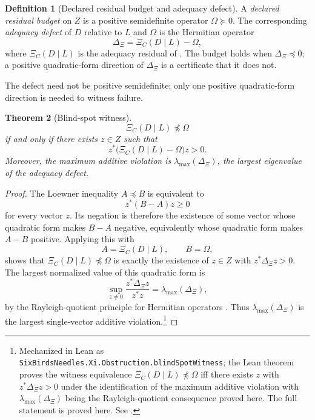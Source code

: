 \documentclass[11pt]{article}
\newcommand{\preceqq}{\preceq}
\newtheorem{theorem}{Theorem}[section]
\theoremstyle{definition}
\newtheorem{definition}[theorem]{Definition}
\begin{document}
\begin{definition}[Declared residual budget and adequacy defect]\label{def:xi:adequacy-defect}
A \emph{declared residual budget} on \(Z\) is a positive semidefinite operator
\(\Omega\succeq 0\).  The corresponding \emph{adequacy defect} of \(D\)
relative to \(L\) and \(\Omega\) is the Hermitian operator
\[
  \Delta_\Xi=\Xi_C(D\mid L)-\Omega,
\]
where \(\Xi_C(D\mid L)\) is the adequacy residual of
.  The budget holds when
\(\Delta_\Xi\preceqq 0\); a positive quadratic-form direction of
\(\Delta_\Xi\) is a certificate that it does not.
\end{definition}

The defect need not be positive semidefinite; only one positive quadratic-form
direction is needed to witness failure.

\begin{theorem}[Blind-spot witness]\label{thm:xi:blind-spot-witness}
\[
  \Xi_C(D\mid L)\npreceq \Omega
\]
if and only if there exists \(z\in Z\) such that
\[
  \boxed{z^*\bigl(\Xi_C(D\mid L)-\Omega\bigr)z>0.}
\]
Moreover, the maximum additive violation is \(\lambda_{\max}(\Delta_\Xi)\),
the largest eigenvalue of the adequacy defect.
\end{theorem}

\begin{proof}
The Loewner inequality \(A\preceqq B\) is equivalent to
\[
  z^*(B-A)z\geq 0
\]
for every vector \(z\).  Its negation is therefore the existence of some vector
whose quadratic form makes \(B-A\) negative, equivalently whose quadratic form
makes \(A-B\) positive.  Applying this with
\[
  A=\Xi_C(D\mid L),
  \qquad
  B=\Omega,
\]
shows that \(\Xi_C(D\mid L)\npreceq\Omega\) is exactly the existence of
\(z\in Z\) with \(z^*\Delta_\Xi z>0\).  The largest normalized value of this
quadratic form is
\[
  \sup_{z\neq 0}\frac{z^*\Delta_\Xi z}{z^*z}
  =
  \lambda_{\max}(\Delta_\Xi),
\]
by the Rayleigh-quotient principle for Hermitian operators
\citep{Bhatia1997MatrixAnalysis,HornJohnson2013MatrixAnalysis}.  Thus
\(\lambda_{\max}(\Delta_\Xi)\) is the largest single-vector additive violation.\footnote{Mechanized in Lean as \texttt{SixBirdsNeedles.Xi.Obstruction.blindSpotWitness}; the Lean theorem proves the witness equivalence \(\Xi_C(D\mid L)\npreceq\Omega\) iff there exists \(z\) with \(z^*\Delta_\Xi z>0\) under the identification of the maximum additive violation with \(\lambda_{\max}(\Delta_\Xi)\) being the Rayleigh-quotient consequence proved here.  The full statement is proved here.  See .}
\end{proof}
\end{document}
